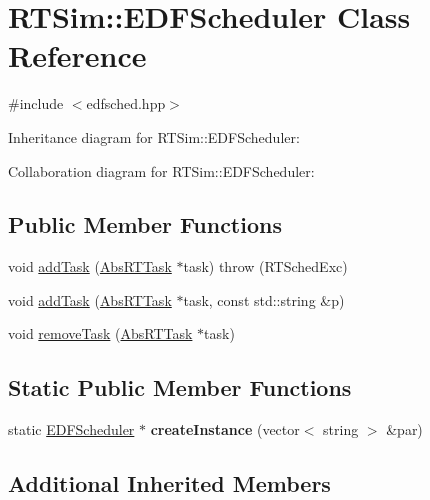 \hypertarget{classRTSim_1_1EDFScheduler}{}\section{R\+T\+Sim\+:\+:E\+D\+F\+Scheduler Class Reference}
\label{classRTSim_1_1EDFScheduler}


{\ttfamily \#include $<$edfsched.\+hpp$>$}



Inheritance diagram for R\+T\+Sim\+:\+:E\+D\+F\+Scheduler\+:


Collaboration diagram for R\+T\+Sim\+:\+:E\+D\+F\+Scheduler\+:
\subsection*{Public Member Functions}
\begin{DoxyCompactItemize}
\item 
void \hyperlink{classRTSim_1_1EDFScheduler_a3f053cc8dc04f1ef61672d212304b249}{add\+Task} (\hyperlink{classRTSim_1_1AbsRTTask}{Abs\+R\+T\+Task} $\ast$task)  throw (\+R\+T\+Sched\+Exc)
\item 
void \hyperlink{classRTSim_1_1EDFScheduler_acded0d3cf423221e79a85506785b0f51}{add\+Task} (\hyperlink{classRTSim_1_1AbsRTTask}{Abs\+R\+T\+Task} $\ast$task, const std\+::string \&p)
\item 
void \hyperlink{classRTSim_1_1EDFScheduler_a9017989c88247012be6ce84a245b3078}{remove\+Task} (\hyperlink{classRTSim_1_1AbsRTTask}{Abs\+R\+T\+Task} $\ast$task)
\end{DoxyCompactItemize}
\subsection*{Static Public Member Functions}
\begin{DoxyCompactItemize}
\item 
static \hyperlink{classRTSim_1_1EDFScheduler}{E\+D\+F\+Scheduler} $\ast$ {\bfseries create\+Instance} (vector$<$ string $>$ \&par)\hypertarget{classRTSim_1_1EDFScheduler_ad35912434a6f588d78feff3d575b48ea}{}\label{classRTSim_1_1EDFScheduler_ad35912434a6f588d78feff3d575b48ea}

\end{DoxyCompactItemize}
\subsection*{Additional Inherited Members}


